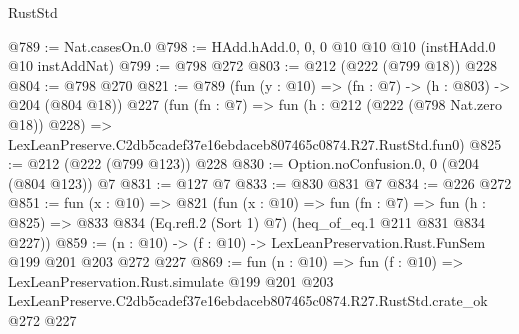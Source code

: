 \begin{lexlean}{RustStd}
\begin{coremodule}
@789 := Nat.casesOn.{0}
@798 := HAdd.hAdd.{0, 0, 0} @10 @10 @10 (instHAdd.{0} @10 instAddNat)
@799 := @798 @272
@803 := @212 (@222 (@799 @18)) @228
@804 := @798 @270
@821 := @789
    (fun (y : @10) => (fn : @7) -> (h : @803) -> @204 (@804 @18))
    @227
    (fun (fn : @7) =>
    fun (h : @212 (@222 (@798 Nat.zero @18)) @228) =>
    LexLeanPreserve.C2db5cadef37e16ebdaceb807465c0874.R27.RustStd.fun0)
@825 := @212 (@222 (@799 @123)) @228
@830 := Option.noConfusion.{0, 0} (@204 (@804 @123)) @7
@831 := @127 @7
@833 := @830 @831 @7
@834 := @226 @272
@851 := fun (x : @10) =>
  @821
    (fun (x : @10) =>
    fun (fn : @7) =>
    fun (h : @825) => @833 @834 (Eq.refl.{2} (Sort 1) @7) (heq_of_eq.{1} @211 @831 @834 @227))
@859 := (n : @10) -> (f : @10) -> LexLeanPreservation.Rust.FunSem @199 @201 @203 @272 @227
@869 := fun (n : @10) =>
  fun (f : @10) =>
  LexLeanPreservation.Rust.simulate
    @199
    @201
    @203
    LexLeanPreserve.C2db5cadef37e16ebdaceb807465c0874.R27.RustStd.crate_ok
    @272
    @227
\end{coremodule}
\end{lexlean}
